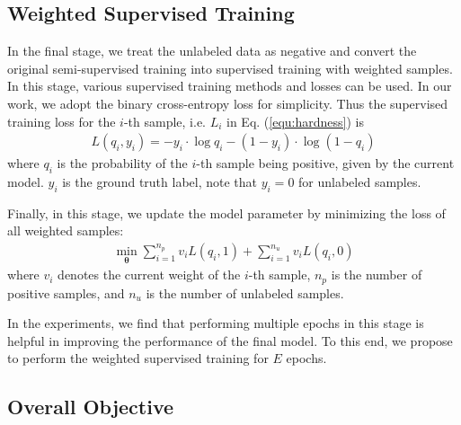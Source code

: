 \documentclass[sigconf]{acmart}
\begin{document}
\subsection{Weighted Supervised Training}

In the final stage, we treat the unlabeled data as negative and convert the original semi-supervised training into supervised training with weighted samples. In this stage, various supervised training methods and losses can be used. In our work, we adopt the binary cross-entropy loss for simplicity. Thus the supervised training loss for the $i$-th sample, i.e. $L_i$ in Eq. (\ref{equ:hardness}) is 
\begin{align}
    L(q_i,y_i)=-y_i\cdot\log q_i-(1-y_i)\cdot\log (1-q_i)\label{eq:bce}
\end{align}
where $q_i$ is the probability of the $i$-th sample being positive, given by the current model. $y_i$ is the ground truth label, note that $y_i=0$ for unlabeled samples.

Finally, in this stage, we update the model parameter by minimizing the loss of all weighted samples:
\begin{align}
    \min_{\mathbf{\theta}}\sum_{i=1}^{n_p}v_iL(q_i,1)+\sum_{i=1}^{n_u}v_iL(q_i,0)
\end{align}
where $v_i$ denotes the current weight of the $i$-th sample, $n_p$ is the number of positive samples, and $n_u$ is the number of unlabeled samples.

In the experiments, we find that performing multiple epochs in this stage is helpful in improving the performance of the final model. To this end, we propose to perform the weighted supervised training for $E$ epochs.

\subsection{Overall Objective}\label{sec:overall}
\end{document}
